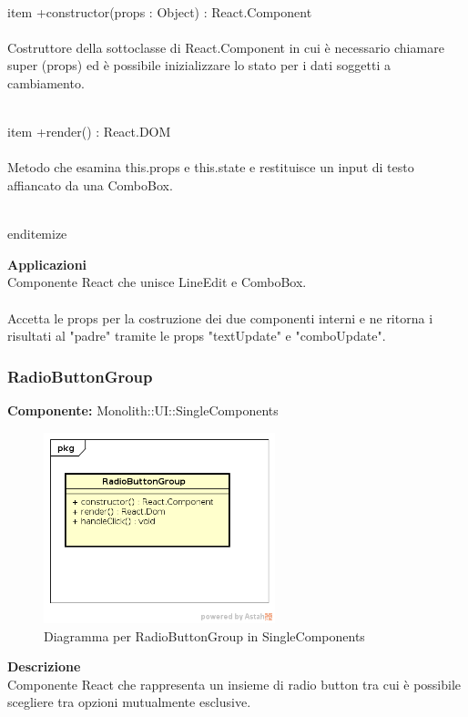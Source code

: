 \\item +constructor(props : Object) : React.Component 
\\\\
Costruttore della sottoclasse di React.Component in cui è necessario chiamare super (props) ed è possibile inizializzare lo stato per i dati soggetti a cambiamento.

\\item +render() : React.DOM 
\\\\
Metodo che esamina this.props e this.state e restituisce un input di testo affiancato da una ComboBox.

\\end{itemize} 


\textbf{Applicazioni}\\
Componente React che unisce LineEdit e ComboBox.\\\\
Accetta le props per la costruzione dei due componenti interni e ne ritorna i risultati al "padre" tramite le props "textUpdate" e "comboUpdate". 


\clearpage

\subsubsection{RadioButtonGroup}
\textbf{Componente:}  Monolith::UI::SingleComponents\\
   \FloatBarrier
   \begin{figure}[ht]
   \centering
   \includegraphics[width=0.6\textwidth]{img/single-RadioButtonGroup}
   \caption{{Diagramma per RadioButtonGroup in SingleComponents}}
\end{figure}
\FloatBarrier
\textbf{Descrizione}\\
Componente React che rappresenta un insieme di radio button tra cui è possibile scegliere tra opzioni mutualmente esclusive.\\\\

